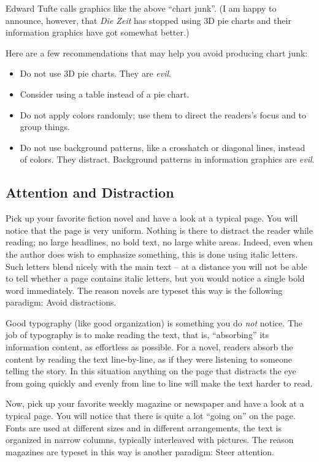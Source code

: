%
Edward Tufte calls graphics like the above ``chart junk''. (I am happy to
announce, however, that \emph{Die Zeit} has stopped using 3D pie charts and
their information graphics have got somewhat better.)

Here are a few recommendations that may help you avoid producing chart junk:
%
\begin{itemize}
    \item Do not use 3D pie charts. They are \emph{evil}.
    \item Consider using a table instead of a pie chart.
    \item Do not apply colors randomly; use them to direct the readers's
        focus and to group things.
    \item Do not use background patterns, like a crosshatch or diagonal
        lines, instead of colors. They distract. Background patterns in
        information graphics are \emph{evil}.
\end{itemize}


\subsection{Attention and Distraction}

Pick up your favorite fiction novel and have a look at a typical page. You will
notice that the page is very uniform. Nothing is there to distract the reader
while reading; no large headlines, no bold text, no large white areas. Indeed,
even when the author does wish to emphasize something, this is done using
italic letters. Such letters blend nicely with the main text -- at a distance
you will not be able to tell whether a page contains italic letters, but you
would notice a single bold word immediately. The reason novels are typeset this
way is the following paradigm: Avoid distractions.

Good typography (like good organization) is something you do \emph{not} notice.
The job of typography is to make reading the text, that is, ``absorbing'' its
information content, as effortless as possible. For a novel, readers absorb the
content by reading the text line-by-line, as if they were listening to someone
telling the story. In this situation anything on the page that distracts the
eye from going quickly and evenly from line to line will make the text harder
to read.

Now, pick up your favorite weekly magazine or newspaper and have a look at a
typical page. You will notice that there is quite a lot ``going on'' on the
page. Fonts are used at different sizes and in different arrangements, the text
is organized in narrow columns, typically interleaved with pictures. The reason
magazines are typeset in this way is another paradigm: Steer attention.


